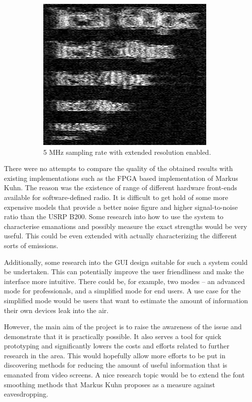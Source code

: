 \documentclass[a4paper,12pt,twoside,openright]{report}
\begin{document}
\begin{figure}[h!]
\begin{subfigure}[t]{0.3\textwidth}
  \includegraphics[width=\textwidth]{sup_res_on}
  \caption{5 MHz sampling rate with extended resolution enabled.}
\end{subfigure}
  \caption{}
  \label{fig:superresolution}
\end{figure}

There were no attempts to compare the quality of the obtained results with existing implementations such as the FPGA based implementation of Markus Kuhn. The reason was the existence of range of different hardware front-ends available for software-defined radio. It is difficult to get hold of some more expensive models that provide a better noise figure and higher signal-to-noise ratio than the USRP B200. Some research into how to use the system to characterise emanations and possibly measure the exact strengths would be very useful. This could be even extended with actually characterizing the different sorts of emissions.

Additionally, some research into the GUI design suitable for such a system could be undertaken. This can potentially improve the user friendliness and make the interface more intuitive. There could be, for example, two modes -- an advanced mode for professionals, and a simplified mode for end users. A use case for the simplified mode would be users that want to estimate the amount of information their own devices leak into the air.

However, the main aim of the project is to raise the awareness of the issue and demonstrate that it is practically possible. It also serves a tool for quick prototyping and significantly lowers the costs and efforts related to further research in the area. This would hopefully allow more efforts to be put in discovering methods for reducing the amount of useful information that is emanated from video screens. A nice research topic would be to extend the font smoothing methods that Markus Kuhn proposes \cite{kuhn2003compromising} as a measure against eavesdropping.
\end{document}
